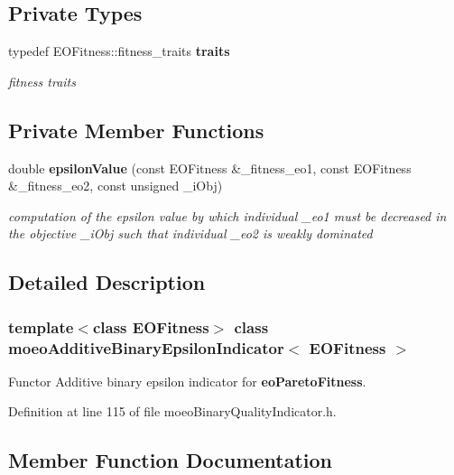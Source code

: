 \subsection*{Private Types}
\begin{CompactItemize}
\item 
typedef EOFitness::fitness\_\-traits {\bf traits}\label{classmoeoAdditiveBinaryEpsilonIndicator_43e2945121a3e77683d935bc72399992}

\begin{CompactList}\small\item\em fitness traits \item\end{CompactList}\end{CompactItemize}
\subsection*{Private Member Functions}
\begin{CompactItemize}
\item 
double {\bf epsilon\-Value} (const EOFitness \&\_\-fitness\_\-eo1, const EOFitness \&\_\-fitness\_\-eo2, const unsigned \_\-i\-Obj)
\begin{CompactList}\small\item\em computation of the epsilon value by which individual \_\-eo1 must be decreased in the objective \_\-i\-Obj such that individual \_\-eo2 is weakly dominated \item\end{CompactList}\end{CompactItemize}


\subsection{Detailed Description}
\subsubsection*{template$<$class EOFitness$>$ class moeo\-Additive\-Binary\-Epsilon\-Indicator$<$ EOFitness $>$}

Functor Additive binary epsilon indicator for {\bf eo\-Pareto\-Fitness}. 



Definition at line 115 of file moeo\-Binary\-Quality\-Indicator.h.

\subsection{Member Function Documentation}

